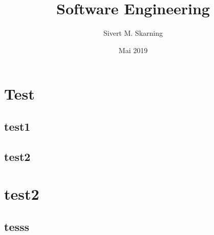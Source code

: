 \documentclass{article}
\title{Software Engineering}
\author{Sivert M. Skarning}
\date{Mai 2019}
\begin{document}
\section{Test}
\subsection{test1}
\subsection{test2}

\section{test2}
\subsection{tesss}
\end{document}
